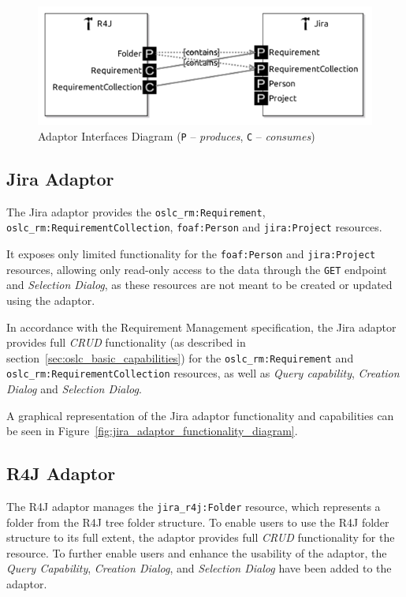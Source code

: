 \begin{figure}[h]
  \centering
  \includegraphics[width= .8\linewidth]{figures/adaptors_interface.jpg}
  \caption{Adaptor Interfaces Diagram (\texttt{P} -- \emph{produces}, \texttt{C} -- \emph{consumes})}
  \label{fig:adaptor_interfaces_diagram}
\end{figure}

\subsection*{Jira Adaptor}
The Jira adaptor provides the \texttt{oslc\_rm:Requirement}, \texttt{oslc\_rm:RequirementCollection}, \texttt{foaf:Person} and \texttt{jira:Project} resources.

It exposes only limited functionality for the \texttt{foaf:Person} and \texttt{jira:Project} resources, allowing only read-only access to the data through the \texttt{GET} endpoint and \emph{Selection Dialog}, as these resources are not meant to be created or updated using the adaptor.

In accordance with the Requirement Management specification, the Jira adaptor provides full \emph{CRUD} functionality (as described in section \ref{sec:oslc_basic_capabilities}) for the \texttt{oslc\_rm:Requirement} and \texttt{oslc\_rm:RequirementCollection} resources, as well as \emph{Query capability}, \emph{Creation Dialog} and \emph{Selection Dialog}.

A graphical representation of the Jira adaptor functionality and capabilities can be seen in Figure \ref{fig:jira_adaptor_functionality_diagram}.

\subsection*{R4J Adaptor}
The R4J adaptor manages the \texttt{jira\_r4j:Folder} resource, which represents a folder from the R4J tree folder structure. To enable users to use the R4J folder structure to its full extent, the adaptor provides full \emph{CRUD} functionality for the resource. To further enable users and enhance the usability of the adaptor, the \emph{Query Capability}, \emph{Creation Dialog}, and \emph{Selection Dialog} have been added to the adaptor.

